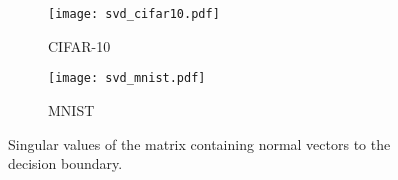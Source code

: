 \begin{figure}
	\centering
	\begin{subfigure}{\textwidth}
		\texttt{[image: svd\_cifar10.pdf]}
		\caption{CIFAR-10}
	\end{subfigure}
	\begin{subfigure}{\textwidth}
		\texttt{[image: svd\_mnist.pdf]}
		\caption{MNIST}
	\end{subfigure}
	
	\caption{Singular values of the matrix containing normal vectors to the decision boundary.}
	\label{fig:svd}
\end{figure}